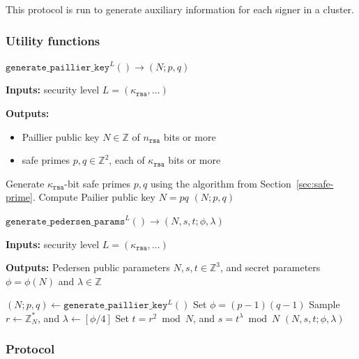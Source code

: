 \documentclass[11pt]{article}
\newenvironment{inlineAlgorithm}{}{}
\newcommand{\algoName}[1]{#1 \par}
\newcommand{\algoInputs}[1]{
    {\small \bf Inputs:} #1 \par
}
\newcommand{\algoOutputs}[1]{
    {\small \bf Outputs:} #1 \par
}
\newcommand{\algoOutputsList}[1]{
    {\small \bf Outputs:}
        \begin{itemize}[noitemsep,topsep=0pt]
            #1
        \end{itemize}
}
\newcommand{\fn}[1]{\ensuremath{\mathtt{#1}}}
\newcommand{\rsa}{\ensuremath{\mathtt{rsa}}}
\newcommand{\Z}{\mathbb{Z}}
\newcommand{\?}[1]{\stackrel{?}{#1}}
\begin{document}
This protocol is run to generate auxiliary information for each signer in a cluster.  

\subsubsection{Utility functions}

\begin{description}

\item
\begin{inlineAlgorithm}
\algoName{$\fn{generate\_paillier\_key}^L() \to (N; p, q)$}
\algoInputs{security level $L = (\kappa_\rsa, \dots)$}
\algoOutputsList{
    \item Paillier public key $N \in \Z$ of $n_\rsa$ bits or more
    \item safe primes $p, q \in \Z^2$, each of $\kappa_\rsa$ bits or more
}
\begin{algorithmic}[1]
\State Generate $\kappa_\rsa$-bit safe primes $p, q$ using the algorithm from Section~\ref{sec:safe-prime}.
\State Compute Pailier public key $N = pq$
\State \Return $(N; p, q)$
\end{algorithmic}
\end{inlineAlgorithm}

\item
\begin{inlineAlgorithm}
\algoName{$\fn{generate\_pedersen\_params}^L() \to (N, s, t; \phi, \lambda)$}
\algoInputs{security level $L = (\kappa_\rsa, \dots)$}
\algoOutputs{Pedersen public parameters $N, s, t \in \Z^3$, and secret parameters $\phi = \phi(N)$ and $\lambda \in \Z$}
\begin{algorithmic}[1]
\State $(N; p, q) \gets \fn{generate\_paillier\_key}^L()$
\State Set $\phi = (p-1)(q-1)$
\State Sample $r \gets \Z^*_N$, and $\lambda \gets [\phi/4]$
\State Set $t = r^2 \bmod N$, and $s = t^\lambda \bmod N$
\State \Return $(N, s, t; \phi, \lambda)$
\end{algorithmic}
\end{inlineAlgorithm}

\end{description}

\subsubsection{Protocol}
\end{document}

